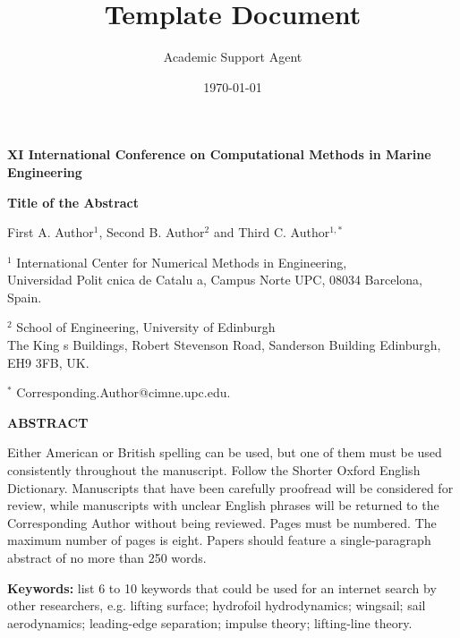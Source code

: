 \documentclass{article}
\title{Template Document}
\author{Academic Support Agent}
\date{\today}
\begin{document}
\maketitle

\begin{center}
\textbf{XI International Conference on Computational Methods in Marine Engineering}

\bigskip
{\Large \textbf{Title of the Abstract}} \\
\bigskip

First A. Author$^1$, Second B. Author$^2$ and Third C. Author$^{1,*}$
  
$^1$ International Center for Numerical Methods in Engineering, \\
Universidad Polit cnica de Catalu a, Campus Norte UPC, 08034 Barcelona, Spain.

$^2$ School of Engineering, University of Edinburgh \\
The King s Buildings, Robert Stevenson Road, Sanderson Building Edinburgh, EH9 3FB, UK.

$^*$ Corresponding.Author@cimne.upc.edu.

\bigskip
{\Large \textbf{ABSTRACT}} \\
\bigskip
\end{center}

Either American or British spelling can be used, but one of them must be used consistently throughout the manuscript. Follow the Shorter Oxford English Dictionary. Manuscripts that have been carefully proofread will be considered for review, while manuscripts with unclear English phrases will be returned to the Corresponding Author without being reviewed. Pages must be numbered. The maximum number of pages is eight. Papers should feature a single-paragraph abstract of no more than 250 words. 


\textbf{Keywords:} list 6 to 10 keywords that could be used for an internet search by other researchers, e.g. lifting surface; hydrofoil hydrodynamics; wingsail; sail aerodynamics; leading-edge separation; impulse theory; lifting-line theory.

\end{document}
